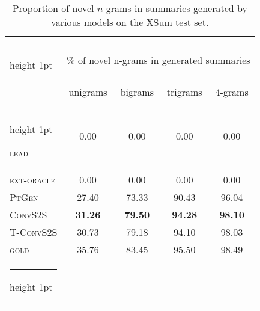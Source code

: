 \documentclass[11pt,a4paper]{article}
\makeatletter
\newcommand{\thickhline}{\noalign {\ifnum 0=`}\fi \hrule height 1pt
    \futurelet \reserved@a \@xhline
}
\makeatother
\begin{document}
\begin{table}
  \begin{center}{\fontsize{8.5}{11}\selectfont \begin{tabular}{ l | c c c c } 
    \thickhline
    \multirow{2}{*}{Models} & \multicolumn{4}{c}{\% of novel n-grams in generated summaries}  \\
    & unigrams & bigrams & trigrams & 4-grams  \\ \thickhline 
    \textsc{lead} & 0.00 & 0.00 & 0.00 & 0.00 \\
    \textsc{ext-oracle} & 0.00 & 0.00 & 0.00 & 0.00 \\
\textsc{PtGen} & 27.40 & 73.33 & 90.43 & 96.04 \\ 
\textsc{ConvS2S} & \textbf{31.26} & \textbf{79.50} & \textbf{94.28} & \textbf{98.10}\\
    \textsc{T-ConvS2S}  & 30.73 & 79.18 & 94.10 & 98.03 \\ \hline
    \textsc{gold} & 35.76 & 83.45  & 95.50  & 98.49 \\ \thickhline
  \end{tabular}}
  \end{center}
  \caption{Proportion of novel $n$-grams in summaries generated by various models on the XSum test set.
    \label{tab:novelngram-xsum-models}}
\end{table}
\end{document}
